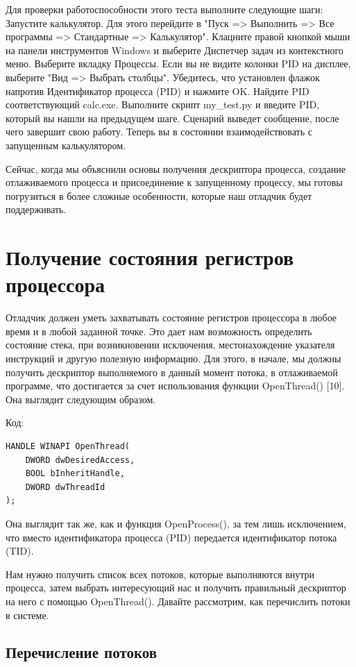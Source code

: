 \documentclass[12pt, a4paper, oneside]{book}
\begin{document}
Для проверки работоспособности этого теста выполните следующие шаги:
Запустите калькулятор. Для этого перейдите в "Пуск => Выполнить => Все программы => Стандартные => Калькулятор".
Клацните правой кнопкой мыши на панели инструментов Windows и выберите Диспетчер задач из контекстного меню.
Выберите вкладку Процессы.
Если вы не видите колонки PID на дисплее, выберите "Вид => Выбрать столбцы".
Убедитесь, что установлен флажок напротив Идентификатор процесса (PID) и нажмите OK.
Найдите PID соответствующий calc.exe.
Выполните скрипт my\_test.py и введите PID, который вы нашли на предыдущем шаге.
Сценарий выведет сообщение, после чего завершит свою работу.
Теперь вы в состоянии взаимодействовать с запущенным калькулятором.

Сейчас, когда мы объяснили основы получения дескриптора процесса, создание отлаживаемого процесса и присоединение к запущенному процессу, мы готовы погрузиться в более сложные особенности, которые наш отладчик будет поддерживать.

\section{Получение состояния регистров процессора}

Отладчик должен уметь захватывать состояние регистров процессора в любое время и в любой заданной точке. Это дает нам возможность определить состояние стека, при возникновении исключения, местонахождение указателя инструкций и другую полезную информацию. Для этого, в начале, мы должны получить дескриптор выполняемого в данный момент потока, в отлаживаемой программе, что достигается за счет использования функции OpenThread() [10]. Она выглядит следующим образом.

Код:
\begin{verbatim}
HANDLE WINAPI OpenThread(
    DWORD dwDesiredAccess,
    BOOL bInheritHandle,
    DWORD dwThreadId
);
\end{verbatim}

Она выглядит так же, как и функция OpenProcess(), за тем лишь исключением, что вместо идентификатора процесса (PID) передается идентификатор потока (TID).

Нам нужно получить список всех потоков, которые выполняются внутри процесса, затем выбрать интересующий нас и получить правильный дескриптор на него с помощью OpenThread(). Давайте рассмотрим, как перечислить потоки в системе. 

\subsection{Перечисление потоков}
\end{document}
